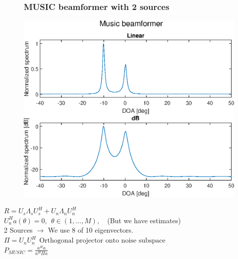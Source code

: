 \documentclass{beamer}
\begin{document}
\begin{frame}
	\begin{figure}
    	\frametitle{MUSIC beamformer with 2 sources}
		\centering
    	\includegraphics[scale=0.4]{Music.eps}\\
	\end{figure}
    $R = U_s \Lambda_s U^H_s + U_n \Lambda_n U^H_n$\\
    $U^H_n a(\theta) = 0,\ \ \theta \in (1,...,M),$\ \ (But we have estimates)\\
    2 Sources $\rightarrow$ We use 8 of 10 eigenvectors.\\
    $\Pi = U_n U^H_n\ \ \text{Orthogonal projector onto noise subspace}$\\
    $P_{MUSIC} = \frac{a^H a}{a^H \Pi a}$\\
\end{frame}
\end{document}
